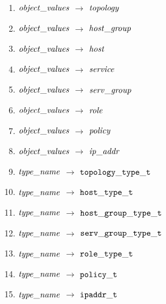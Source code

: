 \begin{enumerate}
\item \noindent ${\it object\_values}$ $\rightarrow$ ${\it topology}$ \\ 
\item ${\it object\_values}$ $\rightarrow$ ${\it host\_group}$ \\ 
\item ${\it object\_values}$ $\rightarrow$ ${\it host}$ \\ 
\item ${\it object\_values}$ $\rightarrow$ ${\it service}$ \\ 
\item ${\it object\_values}$ $\rightarrow$ ${\it serv\_group}$ \\ 
\item ${\it object\_values}$ $\rightarrow$ ${\it role}$ \\ 
\item ${\it object\_values}$ $\rightarrow$ ${\it policy}$ \\
\item ${\it object\_values}$ $\rightarrow$ ${\it ip\_addr}$ \\



\item \noindent ${\it type\_name}$ $\rightarrow$ ${\tt topology\_type\_t}$ \\ 
\item ${\it type\_name}$ $\rightarrow$ ${\tt host\_type\_t}$ \\ 
\item ${\it type\_name}$ $\rightarrow$ ${\tt host\_group\_type\_t}$ \\ 
\item ${\it type\_name}$ $\rightarrow$ ${\tt serv\_group\_type\_t}$ \\ 
\item ${\it type\_name}$ $\rightarrow$ ${\tt role\_type\_t}$ \\ 
\item ${\it type\_name}$ $\rightarrow$ ${\tt policy\_t}$ \\ 
\item ${\it type\_name}$ $\rightarrow$ ${\tt ipaddr\_t}$ \\ 



\end{enumerate}
